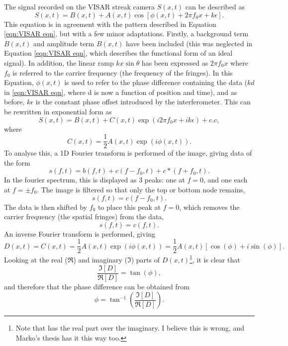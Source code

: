 The signal recorded on the VISAR streak camera $S(x,t)$ can be described as 
\begin{equation} S(x,t) = B(x,t) + A(x,t) \cos[ \phi (x,t) + 2\pi f_0 x + k\epsilon ]. \end{equation}
This equation is in agreement with the pattern described in Equation \ref{eqn:VISAR eqn}, but with a few minor adaptations. Firstly, a background term $B(x,t)$ and amplitude term $B(x,t)$ have been included (this was neglected in Equation \ref{eqn:VISAR eqn}, which describes the functional form of an ideal signal). In addition, the linear ramp $kx\sin\theta$ has been expressed as $2\pi f_0 x$ where $f_0$ is referred to the carrier frequency (the frequency of the fringes). In this Equation, $\phi(x,t)$ is used to refer to the phase difference containing the data ($kd$ in \ref{eqn:VISAR eqn}, where d is now a function of position and time), and as before, $k\epsilon$ is the constant phase offset introduced by the interferometer. This can be rewritten in exponential form as 
\begin{equation} S(x,t) = B(x,t) + C(x,t) \exp(i2\pi f_0 x + ik\epsilon) + c.c, \end{equation} where 
\begin{equation} C(x,t) = \frac{1}{2} A(x,t) \exp(i\phi(x,t)). \end{equation}
To analyse this, a 1D Fourier transform is performed of the image, giving data of the form
\begin{equation} s(f,t) = b(f,t) + c(f - f_0,t) + c*(f + f_0,t). \end{equation}
In the fourier spectrum, this is displayed as 3 peaks: one at $f=0$, and one each at $f = \pm f_0$. The image is filtered so that only the top or bottom node remains,
\begin{equation} s(f,t) = c(f - f_0,t). \end{equation}
The data is then shifted by $f_0$ to place this peak at $f=0$, which removes the carrier frequency (the spatial fringes) from the data,
\begin{equation} s(f,t) = c(f,t). \end{equation}
An inverse Fourier transform is performed, giving 
\begin{equation} D(x,t) = C(x,t) = \frac{1}{2}A(x,t)\exp(i\phi(x,t)) = \frac{1}{2}A(x,t)[\cos(\phi) + i\sin(\phi)]. \end{equation}
Looking at the real ($\Re$) and imaginary ($\Im$) parts of $D(x,t)$\footnote{Note that \cite{Celliers2004} has the real part over the imaginary. I believe this is wrong, and Marko's thesis has it this way too.}, it is clear that 
\begin{equation} \frac{\Im[D]}{\Re[D]} = \tan(\phi), \end{equation}
and therefore that the phase difference can be obtained from 
\begin{equation} \phi = \tan^{-1}(\frac{\Im[D]}{\Re[D]}). \end{equation}

